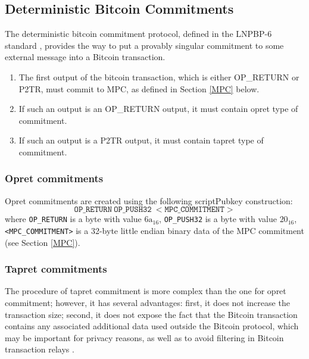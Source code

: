 \documentclass[9pt,oneside]{amsart}
\begin{document}
\begin{multicols}{2}
\subsection{Deterministic Bitcoin Commitments}\label{DBC}

The deterministic bitcoin commitment protocol, defined in the LNPBP-6 standard \cite{LNPBP6},
provides the way to put a provably singular commitment to some external message
into a Bitcoin transaction.

\begin{enumerate}
\item The first output of the bitcoin transaction, which is either OP\_RETURN or P2TR,
    must commit to MPC, as defined in Section \ref{MPC} below.
\item If such an output is an OP\_RETURN output, it must contain \gls{opret} type of commitment.
\item If such an output is a P2TR output, it must contain \gls{tapret} type of commitment.
\end{enumerate}

\subsubsection{Opret commitments}\label{Opret}

Opret commitments are created using the following \textsf{scriptPubkey} construction:
\noindent
\begin{equation}
    \mathtt{OP\_RETURN\ OP\_PUSH32\ <MPC\_COMMITMENT>}
\end{equation}
where \verb|OP_RETURN| is a byte with value $\mathrm{6a}_{16}$,
\verb|OP_PUSH32| is a byte with value $20_{16}$,
\verb|<MPC_COMMITMENT>| is a 32-byte little endian binary data of the MPC commitment
(see Section \ref{MPC}).

\subsubsection{Tapret commitments}\label{Tapret}

The procedure of tapret commitment is more complex than the one for opret commitment;
however, it has several advantages:
first, it does not increase the transaction size;
second, it does not expose the fact that the Bitcoin transaction contains any associated
additional data used outside the Bitcoin protocol, which may be important for privacy reasons,
as well as to avoid filtering in Bitcoin transaction relays \cite{filters}.


\end{multicols}
\end{document}
